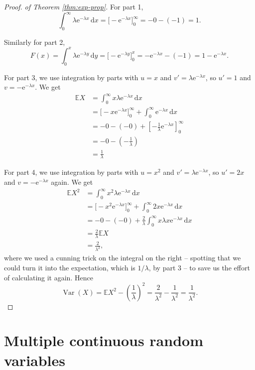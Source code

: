 \documentclass[
  a4paper,
]{book}
\theoremstyle{definition}
\theoremstyle{definition}
\theoremstyle{definition}
\theoremstyle{definition}
\theoremstyle{remark}
\begin{document}
\begin{proof}
\emph{of Theorem \ref{thm:exp-prop}.}
For part 1,
\[ \int_0^\infty \lambda \mathrm{e}^{-\lambda x}\,\mathrm{d}x
     = \big[-\mathrm{e}^{-\lambda x} \big]_0^\infty = -0 -(-1) = 1 . \]

Similarly for part 2,
\[ F(x) = \int_0^x \lambda \mathrm{e}^{-\lambda y}\,\mathrm{d}y
     = \big[-\mathrm{e}^{-\lambda y} \big]_0^x = -\mathrm{e}^{-\lambda x} -(-1) = 1 - \mathrm{e}^{-\lambda x}. \]

For part 3, we use integration by parts with \(u = x\) and \(v' = \lambda \mathrm{e}^{-\lambda x}\), so \(u' = 1\) and \(v = -\mathrm{e}^{-\lambda x}\). We get
\begin{align*}
\mathbb EX &= \int_0^\infty x  \lambda \mathrm{e}^{-\lambda x}\,\mathrm{d}x \\
  &= \big[-x \mathrm{e}^{-\lambda x}\big]_0^\infty + \int_0^\infty \mathrm{e}^{-\lambda x}\,\mathrm{d}x \\
  &= -0 - (-0) + \left[ -\frac{1}{\lambda} \mathrm{e}^{-\lambda x} \right]_0^\infty \\
  &= -0 - \left(- \frac{1}{\lambda}\right) \\
  &= \frac{1}{\lambda}
\end{align*}

For part 4, we use integration by parts with \(u = x^2\) and \(v' = \lambda \mathrm{e}^{-\lambda x}\), so \(u' = 2x\) and \(v = -\mathrm{e}^{-\lambda x}\) again. We get
\begin{align*}
\mathbb EX^2 &= \int_0^\infty x^2  \lambda \mathrm{e}^{-\lambda x}\,\mathrm{d}x \\
  &= \big[-x^2 \mathrm{e}^{-\lambda x}\big]_0^\infty + \int_0^\infty 2x \mathrm{e}^{-\lambda x}\,\mathrm{d}x \\
  &= -0 - (-0) + \frac{2}{\lambda} \int_0^\infty x  \lambda x \mathrm{e}^{-\lambda x}\,\mathrm{d}x \\
  &= \frac{2}{\lambda} \mathbb EX \\
  &= \frac{2}{\lambda^2} ,
\end{align*}
where we used a cunning trick on the integral on the right -- spotting that we could turn it into the expectation, which is \(1/\lambda\), by part 3 -- to save us the effort of calculating it again.
Hence
\[ \operatorname{Var}(X) = \mathbb EX^2 - \left(\frac{1}{\lambda}\right)^2 =  \frac{2}{\lambda^2} - \frac{1}{\lambda^2} = \frac{1}{\lambda^2} .  \]
\end{proof}

\hypertarget{continuous-multiple}{%
\section{Multiple continuous random variables}\label{continuous-multiple}}
\end{document}
